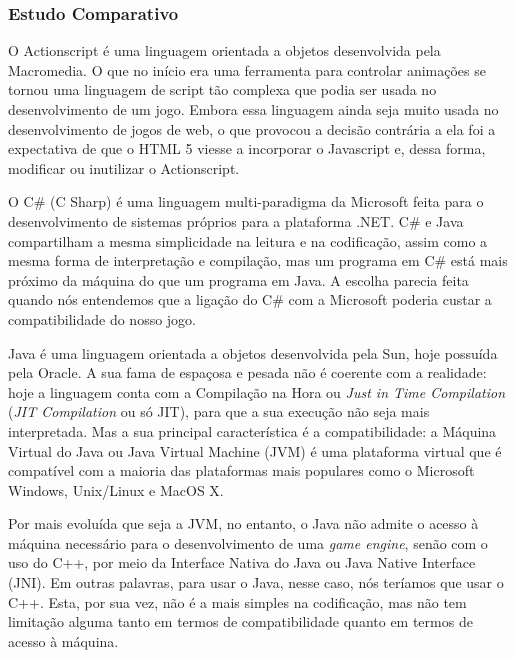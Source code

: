\subsubsection{Estudo Comparativo}
%
O Actionscript é uma linguagem orientada a objetos desenvolvida pela Macromedia. O que no início era uma ferramenta para controlar animações se tornou uma linguagem de script tão complexa que podia ser usada no desenvolvimento de um jogo. Embora essa linguagem ainda seja muito usada no desenvolvimento de jogos de web, o que provocou a decisão contrária a ela foi a expectativa de que o HTML 5 viesse a incorporar o Javascript e, dessa forma, modificar ou inutilizar o Actionscript.
\par
O C\# (C Sharp) é uma linguagem multi-paradigma da Microsoft feita para o desenvolvimento de sistemas próprios para a plataforma .NET. C\# e Java compartilham a mesma simplicidade na leitura e na codificação, assim como a mesma forma de interpretação e compilação, mas um programa em C\# está mais próximo da máquina do que um programa em Java. A escolha parecia feita quando nós entendemos que a ligação do C\# com a Microsoft poderia custar a compatibilidade do nosso jogo.
\par
Java é uma linguagem orientada a objetos desenvolvida pela Sun, hoje possuída pela Oracle. A sua fama de espaçosa e pesada não é coerente com a realidade: hoje a linguagem conta com a Compilação na Hora ou \textit{Just in Time Compilation} (\textit{JIT Compilation} ou só JIT), para que a sua execução não seja mais interpretada. Mas a sua principal característica é a compatibilidade: a Máquina Virtual do Java ou Java Virtual Machine (JVM) é uma plataforma virtual que é compatível com a maioria das plataformas mais populares como o Microsoft Windows, Unix/Linux e MacOS X.
\par
Por mais evoluída que seja a JVM, no entanto, o Java não admite o acesso à máquina necessário para o desenvolvimento de uma \textit{game engine}, senão com o uso do C++, por meio da Interface Nativa do Java ou Java Native Interface (JNI). Em outras palavras, para usar o Java, nesse caso, nós teríamos que usar o C++. Esta, por sua vez, não é a mais simples na codificação, mas não tem limitação alguma tanto em termos de compatibilidade quanto em termos de acesso à máquina.
%
